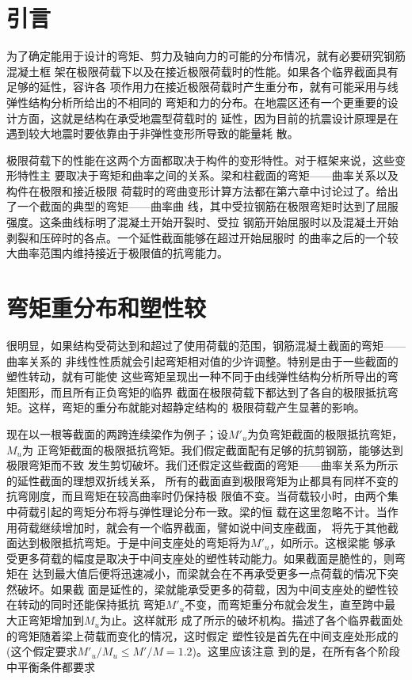 \documentclass[12pt,a4paper]{book}
\begin{document}
\section{引言}

为了确定能用于设计的弯矩、剪力及轴向力的可能的分布情况，就有必要研究钢筋混凝土框
架在极限荷载下以及在接近极限荷载时的性能。如果各个临界截面具有足够的延性，容许各
项作用力在接近极限荷载时产生重分布，就有可能采用与线弹性结构分析所给出的不相同的
弯矩和力的分布。在地震区还有一个更重要的设计方面，这就是结构在承受地震型荷载时的
延性，因为目前的抗震设计原理是在遇到较大地震时要依靠由于非弹性变形所导致的能量耗
散。

极限荷载下的性能在这两个方面都取决于构件的变形特性。对于框架来说，这些变形特性主
要取决于弯矩和曲率之间的关系。梁和柱截面的弯矩——曲率关系以及构件在极限和接近极限
荷载时的弯曲变形计算方法都在第六章中讨论过了。给出了一个截面的典型的弯矩——曲率曲
线，其中受拉钢筋在极限弯矩时达到了屈服强度。这条曲线标明了混凝土开始开裂时、受拉
钢筋开始屈服时以及混凝土开始剥裂和压碎时的各点。一个延性截面能够在超过开始屈服时
的曲率之后的一个较大曲率范围内维持接近于极限值的抗弯能力。

\section{弯矩重分布和塑性较}

很明显，如果结构受荷达到和超过了使用荷载的范围，钢筋混凝土截面的弯矩——曲率关系的
非线性性质就会引起弯矩相对值的少许调整。特别是由于一些截面的塑性转动，就有可能使
这些弯矩呈现出一种不同于由线弹性结构分析所导出的弯矩图形，而且所有正负弯矩的临界
截面在极限荷载下都达到了各自的极限抵抗弯矩。这样，弯矩的重分布就能对超静定结构的
极限荷载产生显著的影响。

现在以一根等截面的两跨连续梁作为例子；设$M'_u$为负弯矩截面的极限抵抗弯矩，$M_u$为
正弯矩截面的极限抵抗弯矩。我们假定截面配有足够的抗剪钢筋，能够达到极限弯矩而不致
发生剪切破坏。我们还假定这些截面的弯矩——曲率关系为所示的延性截面的理想双折线关系，
所有的截面直到极限弯矩为止都具有同样不变的抗弯刚度，而且弯矩在较高曲率时仍保持极
限值不变。当荷载较小时，由两个集中荷载引起的弯矩分布将与弹性理论分布一致。梁的恒
载在这里忽略不计。当作用荷载继续增加时，就会有一个临界截面，譬如说中间支座截面，
将先于其他截面达到极限抵抗弯矩。于是中间支座处的弯矩将为$M'_u$，如所示。这根梁能
够承受更多荷载的幅度是取决于中间支座处的塑性转动能力。如果截面是脆性的，则弯矩在
达到最大值后便将迅速减小，而梁就会在不再承受更多一点荷载的情况下突然破坏。如果截
面是延性的，梁就能承受更多的荷载，因为中间支座处的塑性铰在转动的同时还能保持抵抗
弯矩$M'_u$不变，而弯矩重分布就会发生，直至跨中最大正弯矩增加到$M_u$为止。这样就形
成了所示的破坏机构。描述了各个临界截面处的弯矩随着梁上荷载而变化的情况，这时假定
塑性铰是首先在中间支座处形成的(这个假定要求$M'_u/M_u \le M'/M=1.2$)。这里应该注意
到的是，在所有各个阶段中平衡条件都要求
\end{document}
